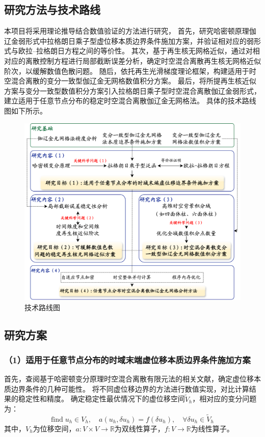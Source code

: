 \setlength{\abovedisplayskip}{0pt}
\setlength{\belowdisplayskip}{0pt}

\subsection{研究方法与技术路线}

本项目将采用理论推导结合数值验证的方法进行研究，
首先，研究哈密顿原理伽辽金弱形式中拉格朗日乘子型虚位移本质边界条件施加方案，并验证相对应的弱形式与欧拉--拉格朗日方程之间的等价性。
其次，基于再生核无网格近似，通过对相对应的离散控制方程进行局部截断误差分析，确定时空混合离散再生核无网格近似阶次，以缓解数值色散问题。
随后，依托再生光滑梯度理论框架，构建适用于时空混合离散的变分一致型伽辽金无网格数值积分方案。
最后，将所提再生核近似方案与变分一致型数值积分方案引入拉格朗日乘子型时空混合离散伽辽金弱形式，建立适用于任意节点分布的稳定时空混合离散伽辽金无网格法。
具体的技术路线图如下所示。

\begin{figure}[!h]
    \centering 
    \includegraphics[width=\textwidth]{figures/roadmap.png}
    \caption{技术路线图}
    \label{fg:roadmap}
\end{figure}

\subsection{研究方案}

\subsubsection*{\bfseries （1）适用于任意节点分布的时域末端虚位移本质边界条件施加方案}
首先，查阅基于哈密顿变分原理时空混合离散有限元法的相关文献，确定虚位移本质边界条件的几种可能性。
将不同虚位移边界的方法进行数值实现，对比计算结果的稳定性和精度。
确定稳定性最优情况下的虚位移空间$\tilde V_h$，相对应的变分问题为：
\begin{equation}
    \text{find} \; u_h \in V_h, \quad a(u_h, \delta u_h) = f(\delta u_h), \quad \forall \delta u_h \in \tilde V_h
    \label{eq:1}
\end{equation}
其中，$V_h$为位移空间，$a:V\times V \rightarrow \mathbb R$为双线性算子，$f:V\rightarrow \mathbb R$为线性算子。

